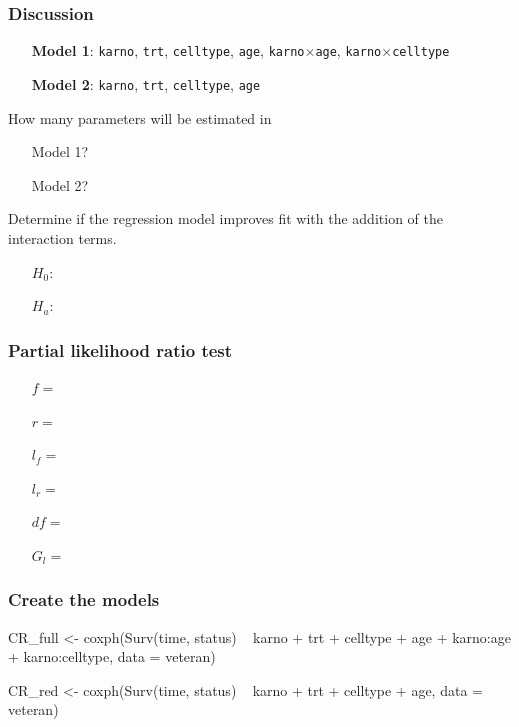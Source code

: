\begin{frame}
\frametitle{Discussion}

\begin{itemize}
\item[\textbf{Model 1}:] \texttt{karno}, \texttt{trt}, \texttt{celltype}, \texttt{age}, \texttt{karno}$\times$\texttt{age}, \texttt{karno}$\times$\texttt{celltype}
\item[]
\item[\textbf{Model 2}:] \texttt{karno}, \texttt{trt}, \texttt{celltype}, \texttt{age}
\item[]
\end{itemize}
\begin{clicker}{How many parameters will be estimated in}
\begin{enumerate}
\item[] Model 1?
\item[] Model 2?
\end{enumerate}
\end{clicker}
Determine if the regression model improves fit with the addition of the interaction terms.
\begin{itemize}
\item[$H_0$:]
\item[]
\item[$H_a$:]
\item[]
\end{itemize}
\end{frame}


\begin{frame}
\frametitle{Partial likelihood ratio test}
\begin{itemize}
\item[$f=$]
\item[]
\item[$r=$]
\item[]
\item[$l_f=$]
\item[]
\item[$l_r=$]
\item[]
\item[$df=$]
\item[]
\item[$G_l=$]
\item[]
\end{itemize}
\end{frame}

\begin{frame}[fragile]
\frametitle{Create the models}
\hspace*{-0.3in}
\begin{Rcode}{-0.05}
CR_full <-
    coxph(Surv(time, status) ~ karno + trt + celltype + age +
                               karno:age + karno:celltype,
            data = veteran)

CR_red <-
    coxph(Surv(time, status) ~ karno + trt + celltype + age,
            data = veteran)
\end{Rcode}
\end{frame}

